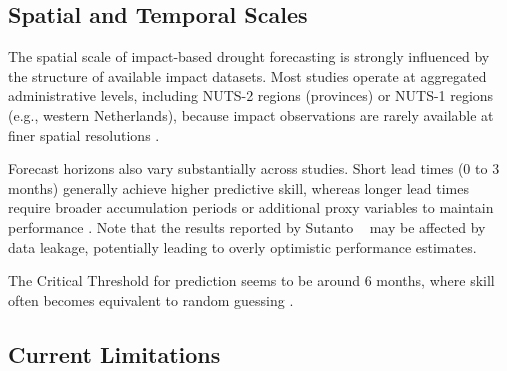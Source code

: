 \subsection{Spatial and Temporal Scales}

The spatial scale of impact-based drought forecasting is strongly influenced by the structure of available impact datasets. Most studies operate at aggregated administrative levels, including NUTS-2 regions (provinces) or NUTS-1 regions (e.g., western Netherlands), because impact observations are rarely available at finer spatial resolutions \cite{Sutanto2019Moving, Bulut2026Framework, Shyrokaya2024Advances}.

Forecast horizons also vary substantially across studies. Short lead times (0 to 3 months) generally achieve higher predictive skill, whereas longer lead times require broader accumulation periods or additional proxy variables to maintain performance \cite{Sutanto2019Moving, Shyrokaya2025HowGood}. Note that the results reported by Sutanto ~\cite{Sutanto2019Moving} may be affected by data leakage, potentially leading to overly optimistic performance estimates.

The Critical Threshold for prediction seems to be around 6 months, where skill often becomes equivalent to random guessing \cite{Bulut2026Framework}. 




\subsection{Current Limitations}

